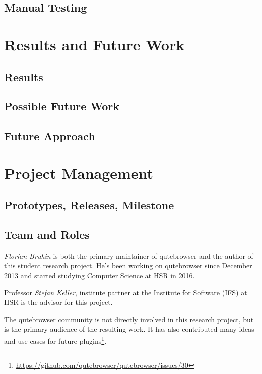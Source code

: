 \documentclass[a4paper,parskip=full]{scrreprt}
\begin{document}
\section{Manual Testing}


\chapter{Results and Future Work}

\section{Results}

\section{Possible Future Work}

\section{Future Approach}


\chapter{Project Management}

\section{Prototypes, Releases, Milestone}

\section{Team and Roles}
\emph{Florian Bruhin} is both the primary maintainer of qutebrowser and the
author of this student research project. He's been working on qutebrowser since
December 2013 and started studying Computer Science at HSR in 2016.

Professor \emph{Stefan Keller}, institute partner at the Institute for Software
(IFS) at HSR is the advisor for this project.

The qutebrowser community is not directly involved in this research project, but
is the primary audience of the resulting work. It has also contributed many
ideas and use cases for future
plugins\footnote{\url{https://github.com/qutebrowser/qutebrowser/issues/30}}.
\end{document}
